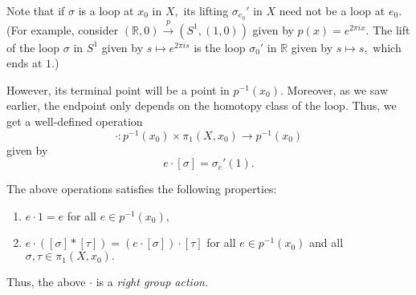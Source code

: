 \documentclass[12pt]{article}
\begin{document}
Note that if $\sigma$ is a loop at $x_0$ in $X,$ its lifting $\sigma_{e_0}'$ in $X$ need not be a loop at $e_0.$ (For example, consider $(\mathbb{R}, 0) \overset{p}{\longrightarrow} (S^1, (1, 0))$ given by $p(x) = e^{2\pi ix}.$ The lift of the loop $\sigma$ in $S^1$ given by $s \mapsto e^{2\pi is}$ is the loop $\sigma_0'$ in $\mathbb{R}$ given by $s \mapsto s,$ which ends at $1.$)

However, its terminal point will be a point in $p^{-1}(x_0).$ Moreover, as we saw earlier, the endpoint only depends on the homotopy class of the loop. Thus, we get a well-defined operation
\begin{equation*} 
	\cdot:p^{-1}(x_0) \times \pi_1(X, x_0) \to p^{-1}(x_0)
\end{equation*}
given by
\begin{equation*} 
	e\cdot[\sigma] = \sigma_e'(1).
\end{equation*}
\begin{prop} \label{prop:dotisgroupact}
	The above operations satisfies the following properties:
	\begin{enumerate}
		\item $e\cdot 1 = e$ for all $e \in p^{-1}(x_0),$
		\item $e\cdot([\sigma]*[\tau]) = (e \cdot [\sigma])\cdot[\tau]$ for all $e \in p^{-1}(x_0)$ and all $\sigma, \tau \in \pi_1(X, x_0).$
	\end{enumerate}
\end{prop}
Thus, the above $\cdot$ is a \emph{right group action.}
\end{document}
